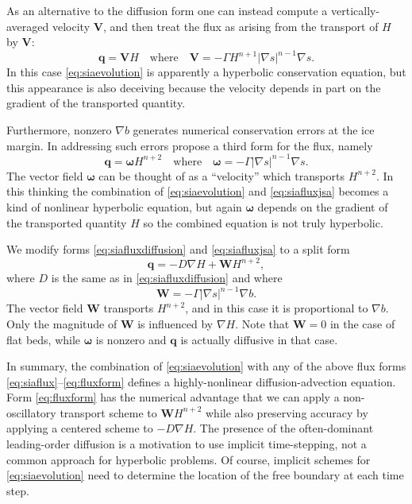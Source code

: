 \documentclass[review,letterpaper]{igs}
\newcommand\bq{\mathbf{q}}
\newcommand\bV{\mathbf{V}}
\newcommand\bW{\mathbf{W}}
\newcommand{\grad}{\nabla}
\begin{document}
As an alternative to the diffusion form one can instead compute a vertically-averaged velocity $\bV$, and then treat the flux as arising from the transport of $H$ by $\bV$:
\begin{equation}
\bq = \bV H \quad \text{where} \quad \bV = - \Gamma H^{n+1} |\grad s|^{n-1} \grad s. \label{eq:siafluxvelocity}
\end{equation}
In this case \eqref{eq:siaevolution} is apparently a hyperbolic conservation equation, but this appearance is also deceiving because the velocity depends in part on the gradient of the transported quantity. 

Furthermore, nonzero $\grad b$ generates numerical conservation errors at the ice margin.  In addressing such errors \cite{JaroschSchoofAnslow2013} propose a third form for the flux, namely
\begin{equation}
   \bq = \boldsymbol{\omega} H^{n+2} \quad \text{where} \quad \boldsymbol{\omega} = - \Gamma |\grad s|^{n-1} \grad s. \label{eq:siafluxjsa}
\end{equation}
The vector field $\boldsymbol{\omega}$ can be thought of as a ``velocity'' which transports $H^{n+2}$.  In this thinking the combination of \eqref{eq:siaevolution} and \eqref{eq:siafluxjsa} becomes a kind of nonlinear hyperbolic equation, but again $\boldsymbol{\omega}$ depends on the gradient of the transported quantity $H$ so the combined equation is not truly hyperbolic.

We modify forms \eqref{eq:siafluxdiffusion} and \eqref{eq:siafluxjsa} to a split form
\begin{equation}
\bq = - D \grad H + \bW H^{n+2},\label{eq:fluxform}
\end{equation}
where $D$ is the same as in \eqref{eq:siafluxdiffusion} and where
\begin{equation}
\bW = - \Gamma |\grad s|^{n-1} \grad b.  \label{eq:siaWdefine}
\end{equation}
The vector field $\bW$ transports $H^{n+2}$, and in this case it is proportional to $\grad b$.  Only the magnitude of $\bW$ is influenced by $\grad H$.  Note that $\bW=0$ in the case of flat beds, while $\boldsymbol{\omega}$ is nonzero and $\bq$ is actually diffusive in that case.

In summary, the combination of \eqref{eq:siaevolution} with any of the above flux forms \eqref{eq:siaflux}--\eqref{eq:fluxform} defines a highly-nonlinear diffusion-advection equation.  Form \eqref{eq:fluxform} has the numerical advantage that we can apply a non-oscillatory transport scheme to $\bW H^{n+2}$ while also preserving accuracy by applying a centered scheme to $-D \grad H$.  The presence of the often-dominant leading-order diffusion is a motivation to use implicit time-stepping, not a common approach for hyperbolic problems.  Of course, implicit schemes for \eqref{eq:siaevolution} need to determine the location of the free boundary at each time step.
\end{document}
